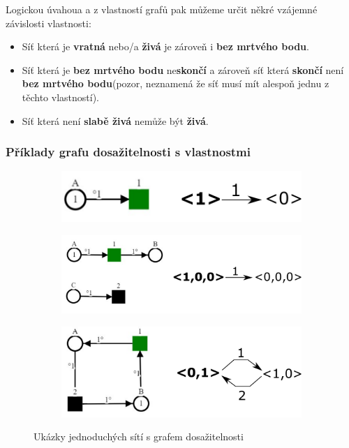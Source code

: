 \documentclass[
  biblatex,
  glossaries,
  index
]{kidiplom}
\begin{document}
Logickou úvahoua a z vlastností grafů pak můžeme určit někré vzájemné závislosti vlastnosti:
\begin{itemize}
  \item Síť která je \textbf{vratná} nebo/a \textbf{živá} je zároveň i \textbf{bez mrtvého bodu}.
  \item Síť která je \textbf{bez mrtvého bodu} ne\textbf{skončí} a zároveň síť která \textbf{skončí} není \textbf{bez mrtvého bodu}(pozor, neznamená že síť musí mít alespoň jednu z těchto vlastností). 
  \item Síť která není \textbf{slabě živá} nemůže být \textbf{živá}.
\end{itemize}

\clearpage
\subsubsection{Příklady grafu dosažitelnosti s vlastnostmi}

\begin{figure}[h!]
  \centering
  \begin{subfigure}[h]{\linewidth}
    \centering
    \includegraphics{net_props_01}
    \caption[síť]{}\label{fig:ukázka grafu dosažitelnosti 1}
  \end{subfigure}
  
  \begin{subfigure}[h]{\linewidth}
    \includegraphics[width=\linewidth]{net_props_02}
    \caption[síť]{}\label{fig:ukázka grafu dosažitelnosti 2}
  \end{subfigure}
  
  \begin{subfigure}[h]{\linewidth}
    \includegraphics[width=\linewidth]{net_props_03}
    \caption[síť]{}\label{fig:ukázka grafu dosažitelnosti 3}
  \end{subfigure}
  \caption{Ukázky jednoduchých sítí s grafem dosažitelnosti}\label{fig: ukázky jednoduchých sítí}
\end{figure}
\end{document}
